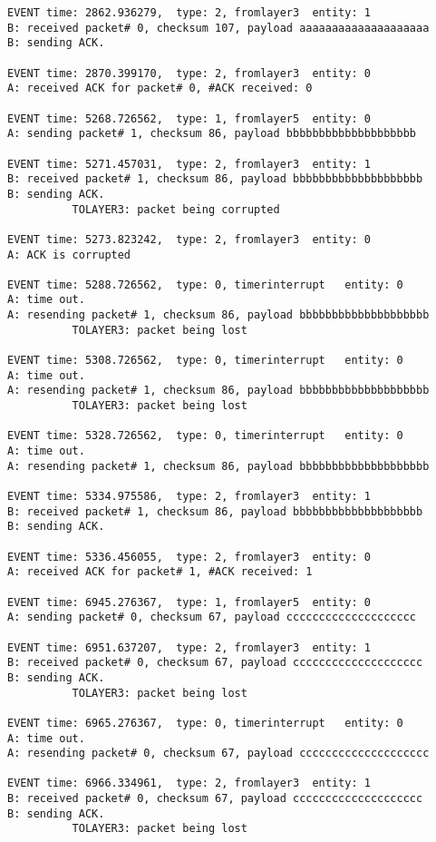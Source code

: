 \documentclass[12pt]{article}
\begin{document}
\begin{Verbatim}[frame=single, rulecolor=\color{cyan}, label=10 messages ACKed correctly]
EVENT time: 2862.936279,  type: 2, fromlayer3  entity: 1
B: received packet# 0, checksum 107, payload aaaaaaaaaaaaaaaaaaaa
B: sending ACK.

EVENT time: 2870.399170,  type: 2, fromlayer3  entity: 0
A: received ACK for packet# 0, #ACK received: 0

EVENT time: 5268.726562,  type: 1, fromlayer5  entity: 0
A: sending packet# 1, checksum 86, payload bbbbbbbbbbbbbbbbbbbb

EVENT time: 5271.457031,  type: 2, fromlayer3  entity: 1
B: received packet# 1, checksum 86, payload bbbbbbbbbbbbbbbbbbbb
B: sending ACK.
          TOLAYER3: packet being corrupted

EVENT time: 5273.823242,  type: 2, fromlayer3  entity: 0
A: ACK is corrupted

EVENT time: 5288.726562,  type: 0, timerinterrupt   entity: 0
A: time out. 
A: resending packet# 1, checksum 86, payload bbbbbbbbbbbbbbbbbbbb
          TOLAYER3: packet being lost

EVENT time: 5308.726562,  type: 0, timerinterrupt   entity: 0
A: time out. 
A: resending packet# 1, checksum 86, payload bbbbbbbbbbbbbbbbbbbb
          TOLAYER3: packet being lost

EVENT time: 5328.726562,  type: 0, timerinterrupt   entity: 0
A: time out. 
A: resending packet# 1, checksum 86, payload bbbbbbbbbbbbbbbbbbbb

EVENT time: 5334.975586,  type: 2, fromlayer3  entity: 1
B: received packet# 1, checksum 86, payload bbbbbbbbbbbbbbbbbbbb
B: sending ACK.

EVENT time: 5336.456055,  type: 2, fromlayer3  entity: 0
A: received ACK for packet# 1, #ACK received: 1

EVENT time: 6945.276367,  type: 1, fromlayer5  entity: 0
A: sending packet# 0, checksum 67, payload cccccccccccccccccccc

EVENT time: 6951.637207,  type: 2, fromlayer3  entity: 1
B: received packet# 0, checksum 67, payload cccccccccccccccccccc
B: sending ACK.
          TOLAYER3: packet being lost

EVENT time: 6965.276367,  type: 0, timerinterrupt   entity: 0
A: time out. 
A: resending packet# 0, checksum 67, payload cccccccccccccccccccc

EVENT time: 6966.334961,  type: 2, fromlayer3  entity: 1
B: received packet# 0, checksum 67, payload cccccccccccccccccccc
B: sending ACK.
          TOLAYER3: packet being lost


\end{Verbatim}
\end{document}

